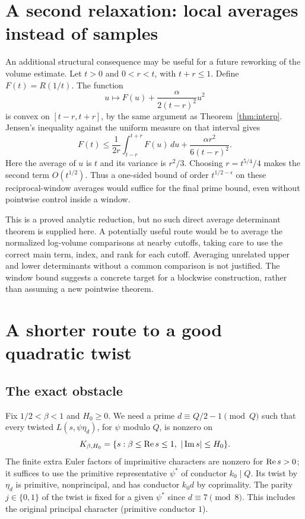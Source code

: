 \documentclass[11pt,a4paper]{article}
\theoremstyle{remark}\newtheorem{remark}[theorem]{Remark}
\newcommand{\Ima}{\operatorname{Im}}\newcommand{\E}{\mathcal E}\newcommand{\pos}[1]{\left(#1\right)_+}
\begin{document}
\section{A second relaxation: local averages instead of samples}
An additional structural consequence may be useful for a future reworking of the volume estimate. Let $t>0$ and $0<r<t$, with $t+r\le1$. Define $F(t)=R(1/t)$. The function
\[u\mapsto F(u)+\frac{\alpha}{2(t-r)^2}u^2\]
is convex on $[t-r,t+r]$, by the same argument as Theorem~\ref{thm:interp}. Jensen's inequality against the uniform measure on that interval gives
\begin{equation}\label{eq:average}
F(t)\le\frac1{2r}\int_{t-r}^{t+r} F(u)\,du+\frac{\alpha r^2}{6(t-r)^2}.
\end{equation}
Here the average of $u$ is $t$ and its variance is $r^2/3$. Choosing $r=t^{5/4}/4$ makes the second term $O(t^{1/2})$. Thus a one-sided bound of order $t^{1/2-\epsilon}$ on these reciprocal-window averages would suffice for the final prime bound, even without pointwise control inside a window.

This is a proved analytic reduction, but no such direct average determinant theorem is supplied here. A potentially useful route would be to average the normalized log-volume comparisons at nearby cutoffs, taking care to use the correct main term, index, and rank for each cutoff. Averaging unrelated upper and lower determinants without a common comparison is not justified. The window bound suggests a concrete target for a blockwise construction, rather than assuming a new pointwise theorem.

\section{A shorter route to a good quadratic twist}\label{sec:twists}
\subsection{The exact obstacle}
Fix $1/2<\beta<1$ and $H_0\ge0$. We need a prime $d\equiv Q/2-1\pmod Q$ such that every twisted $L(s,\psi\eta_d)$, for $\psi$ modulo $Q$, is nonzero on
\[K_{\beta,H_0}=\{s:\beta\le\Rea s\le1,\ |\Ima s|\le H_0\}.
\]
The finite extra Euler factors of imprimitive characters are nonzero for $\operatorname{Re} s>0$; it suffices to use the primitive representative $\psi^*$ of conductor $k_0\mid Q$. Its twist by $\eta_d$ is primitive, nonprincipal, and has conductor $k_0d$ by coprimality. The parity $j\in\{0,1\}$ of the twist is fixed for a given $\psi^*$ since $d\equiv7\pmod8$. This includes the original principal character (primitive conductor $1$).
\end{document}
